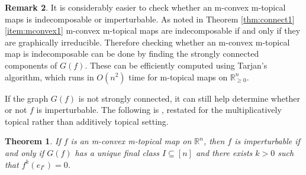 \documentclass[10pt,reqno]{amsart}
\newcommand{\R}{\mathbb{R}}
\theoremstyle{plain}
\newtheorem{theorem}{Theorem}[section]
\theoremstyle{definition}
\newtheorem{remark}[theorem]{Remark}
\numberwithin{equation}{section}
\begin{document}
\begin{remark}
It is considerably easier to check whether an m-convex m-topical maps is indecomposable or imperturbable. As noted in Theorem \ref{thm:connect1}\eqref{item:mconvex1} m-convex m-topical maps are indecomposable if and only if they are graphically irreducible. Therefore checking whether an m-convex m-topical map is indecomposable can be done by finding the strongly connected components of $G(f)$.  %
These can be efficiently computed using Tarjan's algorithm, which runs in $O(n^2)$ time for m-topical maps on $\R^n_{\ge 0}$. 

If the graph $G(f)$ is not strongly connected, it can still help determine whether or not $f$ is imperturbable.  The following is \cite[Corollary 4.4]{AkianGaubertHochart20}, restated for the multiplicatively topical rather than additively topical setting. 

\begin{theorem}
If $f$ is an m-convex m-topical map on $\R^n$, then $f$ is imperturbable if and only if $G(f)$ has a unique final class $I \subseteq [n]$ and there exists $k > 0$ such that $f^k(e_{I^c}) = 0$.  
\end{theorem}
\end{remark}
\end{document}
